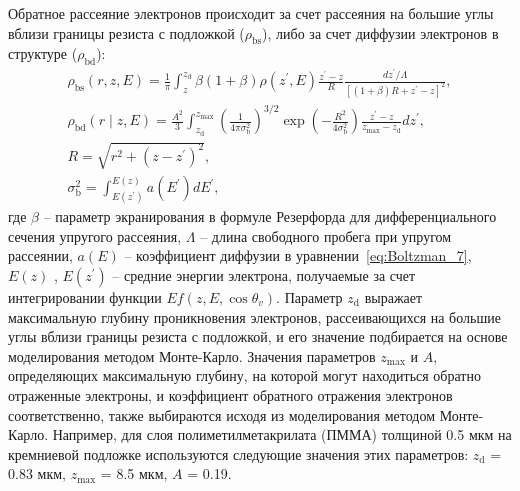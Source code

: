 Обратное рассеяние электронов происходит за счет рассеяния на большие углы вблизи границы резиста с подложкой ($\rho_\mathrm{bs}$), либо за счет диффузии электронов в структуре ($\rho_\mathrm{bd}$):
\begin{equation} \label{eq:Boltzman_12}
	\begin{gathered}
		\rho_\mathrm{bs}(r, z, E)=\frac{1}{\pi} \int_z^{z_\mathrm{d}} \beta(1+\beta) \rho\left(z^{\prime}, E\right) \frac{z^{\prime}-z}{R} \frac{d z^{\prime} / \Lambda}{\left[(1+\beta) R+z^{\prime}-z\right]^2}, \\
		\rho_\mathrm{bd}(r \mid z, E)=\frac{A^2}{3} \int_{z_\mathrm{d}}^{z_\mathrm{max}}\left(\frac{1}{4 \pi \sigma_\mathrm{b}^2}\right)^{3 / 2} \exp \left(-\frac{R^2}{4 \sigma_\mathrm{b}^2}\right) \frac{z^{\prime}-z}{z_{\max }-z_\mathrm{d}} d z^{\prime},\\
		R=\sqrt{r^2+\left(z-z^{\prime}\right)^2}, \\ \sigma_\mathrm{b}^2=\int_{E\left(z^{\prime}\right)}^{E(z)} a\left(E^{\prime}\right) d E^{\prime},
	\end{gathered}
\end{equation}
где $\beta$ -- параметр экранирования в формуле Резерфорда для дифференциального сечения упругого рассеяния, $\Lambda$ -- длина свободного пробега при упругом рассеянии, $a(E)$ -- коэффициент диффузии в уравнении~\ref{eq:Boltzman_7}, $E(z)$ , $E(z^\prime)$ -- средние энергии электрона, получаемые за счет интегрировании функции $Ef(z, E, \cos \theta_v )$. Параметр $z_\mathrm{d}$ выражает максимальную глубину проникновения электронов, рассеивающихся на большие углы вблизи границы резиста с подложкой, и его значение подбирается на основе моделирования методом Монте-Карло. Значения параметров $z_\mathrm{max}$ и $A$, определяющих максимальную глубину, на которой могут находиться обратно отраженные электроны, и коэффициент обратного отражения электронов соответственно, также выбираются исходя из моделирования методом Монте-Карло. Например, для слоя полиметилметакрилата (ПММА) толщиной 0.5 мкм на кремниевой подложке используются следующие значения этих параметров: $z_\mathrm{d}$ = 0.83 мкм, $z_\mathrm{max}$ = 8.5 мкм, $A$ = 0.19.


